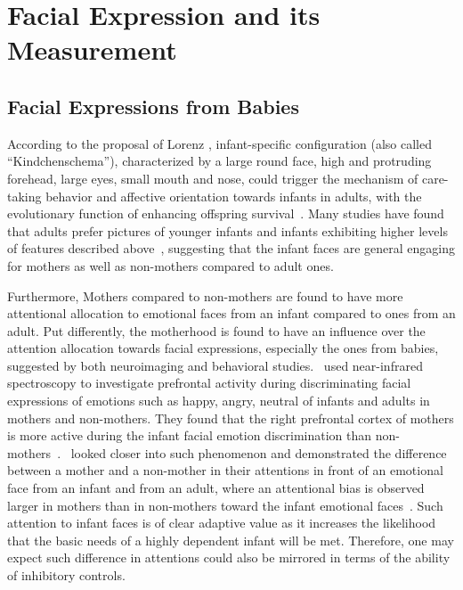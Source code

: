 \section{Facial Expression and its Measurement}	\label{sec.facialexp}

\subsection{Facial Expressions from Babies}\label{subsec.facialexpbaby}

According to the proposal of Lorenz \citep{lorenz1943angeborenen}, infant-specific configuration (also called ``Kindchenschema''), characterized by a large round face, high and protruding forehead, large eyes, small mouth and nose, could trigger the mechanism of care-taking behavior and affective orientation towards infants in adults, with the evolutionary function of enhancing offspring survival~\citep{hrdy2007evolutionary,bowlby1969attachment,tinbergen1951study}. Many studies have found that adults prefer pictures of younger infants and infants exhibiting higher levels of features described above~\citep{glocker2009baby,luo2011children,sanefuji2007development}, suggesting that the infant faces are general engaging for mothers as well as non-mothers compared to adult ones. 

Furthermore, Mothers compared to non-mothers are found to have more attentional allocation to emotional faces from an infant compared to ones from an adult. Put differently, the motherhood is found to have an influence over the attention allocation towards facial expressions, especially the ones from babies, suggested by both neuroimaging and behavioral studies.~\citeauthor{nishitani2011differential} used near-infrared spectroscopy to investigate prefrontal activity during discriminating facial expressions of emotions such as happy, angry, neutral of infants and adults in mothers and non-mothers. They found that the right prefrontal cortex of mothers is more active during the infant facial emotion discrimination than non-mothers~\citep{nishitani2011differential}.~\citeauthor{thompson2014here} looked closer into such phenomenon and demonstrated the difference between a mother and a non-mother in their attentions in front of an emotional face from an infant and from an adult, where an attentional bias is observed larger in mothers than in non-mothers toward the infant emotional faces~\citep{thompson2014here}. Such attention to infant faces is of clear adaptive value as it increases the likelihood that the basic needs of a highly dependent infant will be met. Therefore, one may expect such difference in attentions could also be mirrored in terms of the ability of inhibitory controls.
			
